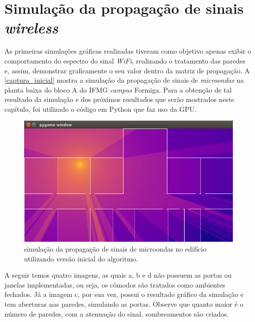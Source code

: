 \documentclass[
	12pt,				%
	openright,			%
	twoside,			%
	a4paper,			%
	english,			%
	french,				%
	spanish,			%
	brazil				%
	]{abntex2}
\begin{document}
\section[Simulação da propagação de sinais wireless]{Simulação da propagação de sinais \textit{wireless}}

As primeiras simulações gráficas realizadas tiveram como objetivo apenas exibir o comportamento do espectro do sinal \textit{WiFi}, realizando o tratamento das paredes e, assim, demonstrar graficamente o seu valor dentro da matriz de propagação. A \autoref{captura_inicial} mostra a simulação da propagação de sinais de \textit{microondas} na planta baixa do bloco A do IFMG \textit{campus} Formiga. Para a obtenção de tal resultado da simulação e dos próximos resultados que serão mostrados neste capítulo, foi utilizado o código em Python que faz uso da GPU.

\begin{figure}[ht]
	\caption{\label{captura_inicial}simulação da propagação de sinais de microondas no edifício utilizando versão inicial do algoritmo.
		}
	\begin{center}
		\includegraphics[scale=0.6]{images/captura-inicial.jpg}
	\end{center}
\end{figure}

A seguir temos quatro imagens, as quais a, b e d não possuem as portas ou janelas implementadas, ou seja, os cômodos são tratados como ambientes fechados. Já a imagem c, por sua vez, possui o resultado gráfico da simulação e tem aberturas nas paredes, simulando as portas. Observe que quanto maior é o número de paredes, com a atenuação do sinal, sombreamentos são criados.
\end{document}
